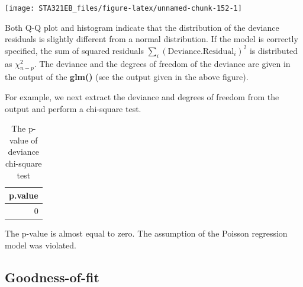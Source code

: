 \documentclass[
]{book}
\newenvironment{Shaded}{\begin{snugshade}}{\end{snugshade}}
\newcommand{\AttributeTok}[1]{\textcolor[rgb]{0.13,0.29,0.53}{#1}}
\newcommand{\CommentTok}[1]{\textcolor[rgb]{0.56,0.35,0.01}{\textit{#1}}}
\newcommand{\DecValTok}[1]{\textcolor[rgb]{0.00,0.00,0.81}{#1}}
\newcommand{\FunctionTok}[1]{\textcolor[rgb]{0.13,0.29,0.53}{\textbf{#1}}}
\newcommand{\NormalTok}[1]{#1}
\newcommand{\OtherTok}[1]{\textcolor[rgb]{0.56,0.35,0.01}{#1}}
\newcommand{\SpecialCharTok}[1]{\textcolor[rgb]{0.81,0.36,0.00}{\textbf{#1}}}
\newcommand{\StringTok}[1]{\textcolor[rgb]{0.31,0.60,0.02}{#1}}
\begin{document}
\begin{center}\texttt{[image: STA321EB\_files/figure-latex/unnamed-chunk-152-1]} \end{center}

Both Q-Q plot and histogram indicate that the distribution of the deviance residuals is slightly different from a normal distribution. If the model is correctly specified, the sum of squared residuals \(\sum_i(\text{Deviance.Residual}_i)^2\) is distributed as \(\chi^2_{n-p}\). The deviance and the degrees of freedom of the deviance are given in the output of the \textbf{glm()} (see the output given in the above figure).

For example, we next extract the deviance and degrees of freedom from the output and perform a chi-square test.

\begin{Shaded}
\end{Shaded}

\begin{table}

\caption{\label{tab:unnamed-chunk-153}The p-value of deviance chi-square test}
\centering
\begin{tabular}[t]{r}
\hline
p.value\\
\hline
0\\
\hline
\end{tabular}
\end{table}

The p-value is almost equal to zero. The assumption of the Poisson regression model was violated.

\hypertarget{goodness-of-fit}{%
\subsection{Goodness-of-fit}\label{goodness-of-fit}}
\end{document}
